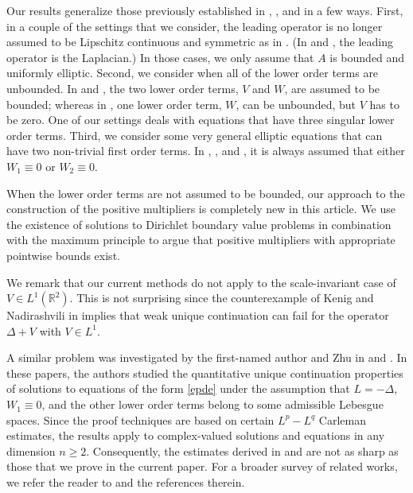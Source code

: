 \documentclass[12pt,reqno]{amsart}
\theoremstyle{plain}
\theoremstyle{definition}
\newcommand{\LP}{\Delta}
\newcommand{\pr}[1]{\left( #1 \right) }
\newcommand{\R}{\ensuremath{\mathbb{R}}}
\begin{document}
Our results generalize those previously established in \cite{KSW15}, \cite{KW15}, and \cite{DKW17} in a few ways.
First, in a couple of the settings that we consider, the leading operator is no longer assumed to be Lipschitz continuous and symmetric as in \cite{DKW17}.
(In \cite{KSW15} and \cite{KW15}, the leading operator is the Laplacian.)
In those cases, we only assume that $A$ is bounded and uniformly elliptic.
Second, we consider when all of the lower order terms are unbounded.
In \cite{KSW15} and \cite{DKW17}, the two lower order terms, $V$ and $W$, are assumed to be bounded; whereas in \cite{KW15}, one lower order term, $W$, can be unbounded, but $V$ has to be zero.
One of our settings deals with equations that have three singular lower order terms.
Third, we consider some very general elliptic equations that can have two non-trivial first order terms.
In \cite{KSW15}, \cite{KW15}, and \cite{DKW17}, it is always assumed that either $W_1 \equiv 0$ or $W_2 \equiv 0$.

When the lower order terms are not assumed to be bounded, our approach to the construction of the positive multipliers is completely new in this article.  
We use the existence of solutions to Dirichlet boundary value problems in combination with the maximum principle to argue that positive multipliers with appropriate pointwise bounds exist.

We remark that our current methods do not apply to the scale-invariant case of $V \in L^1\pr{\R^2}$.
This is not surprising since the counterexample of Kenig and Nadirashvili in \cite{KN00} implies that weak unique continuation can fail for the operator $\LP + V$ with $V \in L^1$. 

A similar problem was investigated by the first-named author and Zhu in \cite{DZ17} and \cite{DZ217}.
In these papers, the authors studied the quantitative unique continuation properties of solutions to equations of the form \eqref{epde} under the assumption that $L = -\LP$, $W_1 \equiv 0$, and the other lower order terms belong to some admissible Lebesgue spaces.
Since the proof techniques are based on certain $L^p - L^q$ Carleman estimates, the results apply to complex-valued solutions and equations in any dimension $n \ge 2$.
Consequently, the estimates derived in \cite{DZ17} and \cite{DZ217} are not as sharp as those that we prove in the current paper.
For a broader survey of related works, we refer the reader to \cite{KSW15} and the references therein.
\end{document}
